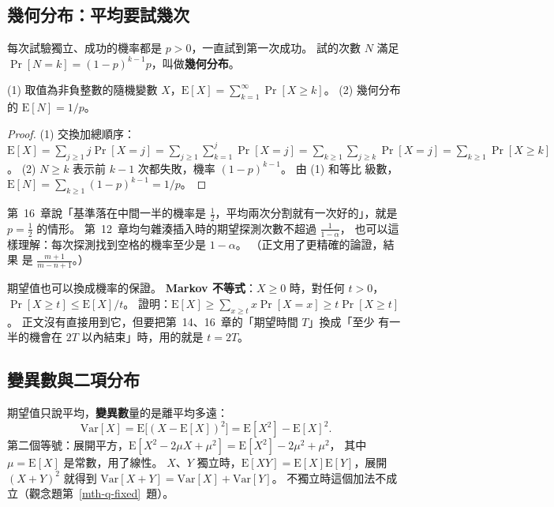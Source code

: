 \subsection{幾何分布：平均要試幾次}

每次試驗獨立、成功的機率都是 $p > 0$，一直試到第一次成功。 試的次數 $N$ 滿足
$\Pr[N = k] = (1 - p)^{k-1} p$，叫做\textbf{幾何分布}。

\begin{theorem}
\label{thm:mth-geom-dist}
(1) 取值為非負整數的隨機變數 $X$，$\mathrm{E}[X] = \sum_{k=1}^{\infty} \Pr[X \ge k]$。
(2) 幾何分布的 $\mathrm{E}[N] = 1/p$。
\end{theorem}

\begin{proof}
(1) 交換加總順序：$\mathrm{E}[X] = \sum_{j \ge 1} j \Pr[X = j] = \sum_{j \ge 1}
\sum_{k=1}^{j} \Pr[X = j] = \sum_{k \ge 1} \sum_{j \ge k} \Pr[X = j] = \sum_{k \ge 1}
\Pr[X \ge k]$。 (2) $N \ge k$ 表示前 $k - 1$ 次都失敗，機率 $(1-p)^{k-1}$。 由 (1) 和等比
級數，$\mathrm{E}[N] = \sum_{k \ge 1} (1-p)^{k-1} = 1/p$。
\end{proof}

第~16~章說「基準落在中間一半的機率是 $\frac12$，平均兩次分割就有一次好的」，就是
$p = \frac12$ 的情形。 第~12~章均勻雜湊插入時的期望探測次數不超過 $\frac{1}{1-\alpha}$，
也可以這樣理解：每次探測找到空格的機率至少是 $1 - \alpha$。 （正文用了更精確的論證，結果
是 $\frac{m+1}{m-n+1}$。）

期望值也可以換成機率的保證。 \textbf{Markov 不等式}：$X \ge 0$ 時，對任何 $t > 0$，
$\Pr[X \ge t] \le \mathrm{E}[X] / t$。 證明：$\mathrm{E}[X] \ge \sum_{x \ge t} x \Pr[X = x]
\ge t \Pr[X \ge t]$。 正文沒有直接用到它，但要把第~14、16~章的「期望時間 $T$」換成「至少
有一半的機會在 $2T$ 以內結束」時，用的就是 $t = 2T$。

\subsection{變異數與二項分布}

期望值只說平均，\textbf{變異數}量的是離平均多遠：
\[
\mathrm{Var}[X] = \mathrm{E}\bigl[(X - \mathrm{E}[X])^2\bigr] = \mathrm{E}[X^2] - \mathrm{E}[X]^2 .
\]
第二個等號：展開平方，$\mathrm{E}[X^2 - 2\mu X + \mu^2] = \mathrm{E}[X^2] - 2\mu^2 + \mu^2$，
其中 $\mu = \mathrm{E}[X]$ 是常數，用了線性。 $X$、$Y$ 獨立時，$\mathrm{E}[XY] =
\mathrm{E}[X]\mathrm{E}[Y]$，展開 $(X + Y)^2$ 就得到 $\mathrm{Var}[X + Y] = \mathrm{Var}[X] +
\mathrm{Var}[Y]$。 不獨立時這個加法不成立（觀念題第~\ref{mth-q-fixed}~題）。

